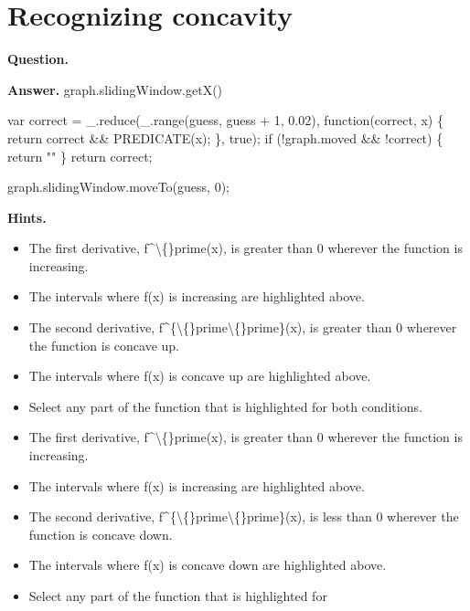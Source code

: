 \documentclass{article}
\begin{document}
\section*{Recognizing concavity}
\textbf{Question.} 

\textbf{Answer.} graph.slidingWindow.getX()
        
        
            var correct = \_.reduce(\_.range(guess, guess + 1, 0.02), function(correct, x) \{
                return correct \&\& PREDICATE(x);
            \}, true);
            if (!graph.moved \&\& !correct) \{
                return ""
            \}
            return correct;
        
        
            graph.slidingWindow.moveTo(guess, 0);

\textbf{Hints.}
\begin{itemize}
  \item The first derivative, f\textasciicircum{}\textbackslash\{\}prime(x), is greater
                    than 0 wherever the function is increasing.
  \item The intervals
                        where f(x) is increasing
                        are
                        highlighted above.
  \item The second derivative, f\textasciicircum{}\{\textbackslash\{\}prime\textbackslash\{\}prime\}(x), is greater
                    than 0 wherever the function is concave up.
  \item The intervals
                        where f(x) is concave up
                        are
                        highlighted above.
  \item Select any part of the function that is highlighted for
                        both conditions.
  \item The first derivative, f\textasciicircum{}\textbackslash\{\}prime(x), is greater
                    than 0 wherever the function is increasing.
  \item The intervals
                        where f(x) is increasing
                        are
                        highlighted above.
  \item The second derivative, f\textasciicircum{}\{\textbackslash\{\}prime\textbackslash\{\}prime\}(x), is less
                    than 0 wherever the function is concave down.
  \item The intervals
                        where f(x) is concave down
                        are
                        highlighted above.
  \item Select any part of the function that is highlighted for

\end{itemize}
\end{document}
